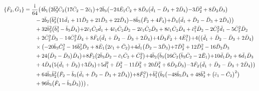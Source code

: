 \documentclass[10pt]{amsart}
\theoremstyle{definition}
\theoremstyle{corollary}
\theoremstyle{remark}
\theoremstyle{conclusion}
\begin{document}
\begin{align}
\{\bar{F}_2, \bar{G}_1\}&=\frac{{\rm i}}{64}  \bigl(4 \bar{b}_1 \bigl(2 \bar{b}_3^2 \bar{C}_2 \bigl(17 \bar{C}_2-2 \bar{c}_1\bigl)+2 \bar{b}_3 \bigl(-24 \bar{E}_1 \bar{C}_2+8 \bar{D}_3 \bigl(\bar{d}_1-\bar{D}_3+2 \bar{D}_4\bigl)-3 \bar{D}_2^2+8 \bar{D}_2 \bar{D}_3\bigl)\nonumber\\
&	\hskip 0.7cm -2 \bar{b}_2 \bigl(\bar{b}_3^2 \bigl(11 \bar{d}_1+11 \bar{D}_2+21 \bar{D}_3+22 \bar{D}_4\bigl)-8 \bar{b}_3 \bigl(\bar{F}_2+4 \bar{F}_4\bigl)+\bar{D}_4 \bigl(\bar{d}_1+\bar{D}_2-\bar{D}_3+2 \bar{D}_4\bigl)\bigl)\nonumber\\
&	\hskip 0.7cm +32 \bar{b}_2^2 \bigl(\bar{b}_3^3-\bar{b}_3 \bar{D}_4\bigl)+2 \bar{c}_1 \bar{C}_2 \bar{d}_1+4 \bar{c}_1 \bar{C}_2 \bar{D}_2-2 \bar{c}_1 \bar{C}_2 \bar{D}_3+8 \bar{c}_1 \bar{C}_2 \bar{D}_4+\bar{c}_1^2 \bar{D}_2-2 \bar{C}_2^2 \bar{d}_1-5 \bar{C}_2^2 \bar{D}_2\nonumber\\
&	\hskip 0.7cm +2 \bar{C}_2^2 \bar{D}_3-14 \bar{C}_2^2 \bar{D}_4+8 \bar{F}_4 \bigl(\bar{d}_1+\bar{D}_2-\bar{D}_3+2 \bar{D}_4\bigl)+4 \bar{D}_3 \bar{F}_2+4 \bar{E}_1^2\bigl)+4 \bigl(\bigl(\bar{d}_1+\bar{D}_2-\bar{D}_3+2 \bar{D}_4\bigl)\nonumber\\
&	\hskip 0.7cm \times \bigl(-20 \bar{b}_3 \bar{C}_2^2-16 \bar{b}_3^2 \bar{D}_2+8 \bar{E}_1 \bigl(2 \bar{c}_1+\bar{C}_2\bigl)+4 \bar{d}_1 \bigl(\bar{D}_2-3 \bar{D}_3\bigl)+7 \bar{D}_2^2+12 \bar{D}_3^2-16 \bar{D}_2 \bar{D}_3\nonumber\\
&	\hskip 0.7cm +24 \bigl(\bar{D}_2-\bar{D}_3\bigl) \bar{D}_4\bigl)+8 \bar{F}_2 \bigl(2 \bar{b}_3 \bar{D}_2-\bar{c}_1 \bar{C}_2+\bar{C}_2^2\bigl)+4 \bar{b}_2 \bigl(\bar{b}_3 \bigl(16 \bar{C}_2 \bigl(\bar{b}_3 \bar{C}_2-2 \bar{E}_1\bigl)+10 \bar{d}_1 \bar{D}_2+6 \bar{d}_1 \bar{D}_3\nonumber\\
&	\hskip 0.7cm +4 \bar{D}_4 \bigl(5 \bigl(\bar{d}_1+\bar{D}_2\bigl)+3 \bar{D}_3\bigl)+5 \bar{d}_1^2+\bar{D}_2^2-11 \bar{D}_3^2+20 \bar{D}_4^2+6 \bar{D}_2 \bar{D}_3\bigl)-3 \bar{F}_2 \bigl(\bar{d}_1+\bar{D}_2-\bar{D}_3+2 \bar{D}_4\bigl)\bigl)\nonumber\\
&	\hskip 0.7cm+64 \bar{b}_3 \bar{b}_2^2 \bigl(\bar{F}_2-\bar{b}_3 \bigl(\bar{d}_1+\bar{D}_2-\bar{D}_3+2 \bar{D}_4\bigl)\bigl)+8 \bar{F}_1^2\bigl)+\bar{b}_1^2 \bigl(\bar{b}_2 \bigl(-48 \bar{b}_3 \bar{D}_4+48 \bar{b}_3^3+\bigl(\bar{c}_1-\bar{C}_2\bigl)^2\bigl)\nonumber\\
&	\hskip 0.7cm+96 \bar{b}_3 \bigl(\bar{F}_4-\bar{b}_3 \bar{D}_3\bigl)\bigl)\bigl)\, ,\nonumber \\

\end{align}
\end{document}
